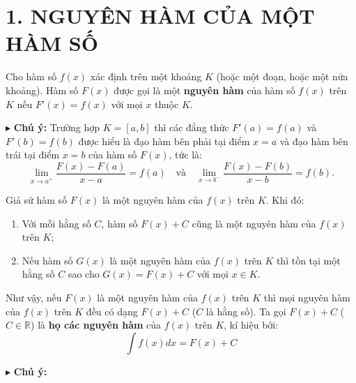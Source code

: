 \documentclass[12pt,a4paper]{extarticle}
\begin{document}
\makeheadbox[headerright={Chương 4},chude={Bài 1},tieude={Nguyên hàm},dinhdang={Xác suất},lop={12 },gv={Nguyễn Lê Minh Ngọc}]
\vspace{2em}
\section*{\color{blue!80!black}1. NGUYÊN HÀM CỦA MỘT HÀM SỐ}
\begin{tcolorbox}[
    colback=blue!5!white,
    colframe=blue!75!black,
    sharp corners,
    boxrule=0pt,
    leftrule=3pt,
    top=8pt,
    bottom=8pt,
    left=12pt
]
    Cho hàm số $f(x)$ xác định trên một khoảng $K$ (hoặc một đoạn, hoặc một nửa khoảng). Hàm số $F(x)$ được gọi là một \textbf{nguyên hàm} của hàm số $f(x)$ trên $K$ nếu $F'(x) = f(x)$ với mọi $x$ thuộc $K$.
\end{tcolorbox}
\vspace{0.5em}
\noindent $\blacktriangleright$ \textbf{Chú ý:} Trường hợp $K = [a, b]$ thì các đẳng thức $F'(a) = f(a)$ và $F'(b) = f(b)$ được hiểu là đạo hàm bên phải tại điểm $x = a$ và đạo hàm bên trái tại điểm $x = b$ của hàm số $F(x)$, tức là:
\[
\lim_{x \to a^+} \frac{F(x) - F(a)}{x - a} = f(a) \quad \text{và} \quad \lim_{x \to b^-} \frac{F(x) - F(b)}{x - b} = f(b).
\]
\vspace{2em}
\begin{tcolorbox}[
    colback=blue!5!white,
    colframe=blue!75!black,
    sharp corners,
    boxrule=0pt,
    leftrule=3pt,
    top=8pt,
    bottom=8pt,
    left=12pt
]
    Giả sử hàm số $F(x)$ là một nguyên hàm của $f(x)$ trên $K$. Khi đó:
    \begin{enumerate}[label=\alph*), leftmargin=*, itemsep=0.4em]
        \item Với mỗi hằng số $C$, hàm số $F(x) + C$ cũng là một nguyên hàm của $f(x)$ trên $K$;
        \item Nếu hàm số $G(x)$ là một nguyên hàm của $f(x)$ trên $K$ thì tồn tại một hằng số $C$ sao cho $G(x) = F(x) + C$ với mọi $x \in K$.
    \end{enumerate}
    Như vậy, nếu $F(x)$ là một nguyên hàm của $f(x)$ trên $K$ thì mọi nguyên hàm của $f(x)$ trên $K$ đều có dạng $F(x) + C$ ($C$ là hằng số). Ta gọi $F(x) + C$ ($C \in \mathbb{R}$) là \textbf{họ các nguyên hàm} của $f(x)$ trên $K$, kí hiệu bởi:
    \[
    \int f(x)dx = F(x) + C
    \]
\end{tcolorbox}
\vspace{1.5em}
\noindent $\blacktriangleright$ \textbf{Chú ý:}
\end{document}
